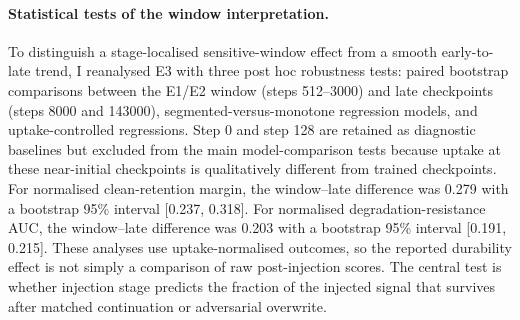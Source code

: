 \paragraph{Statistical tests of the window interpretation.}
To distinguish a stage-localised sensitive-window effect from a smooth early-to-late trend, I reanalysed E3 with three post hoc robustness tests: paired bootstrap comparisons between the E1/E2 window (steps 512--3000) and late checkpoints (steps 8000 and 143000), segmented-versus-monotone regression models, and uptake-controlled regressions. Step 0 and step 128 are retained as diagnostic baselines but excluded from the main model-comparison tests because uptake at these near-initial checkpoints is qualitatively different from trained checkpoints.
For normalised clean-retention margin, the window--late difference was 0.279 with a bootstrap 95\% interval [0.237, 0.318].
For normalised degradation-resistance AUC, the window--late difference was 0.203 with a bootstrap 95\% interval [0.191, 0.215].
These analyses use uptake-normalised outcomes, so the reported durability effect is not simply a comparison of raw post-injection scores. The central test is whether injection stage predicts the fraction of the injected signal that survives after matched continuation or adversarial overwrite.